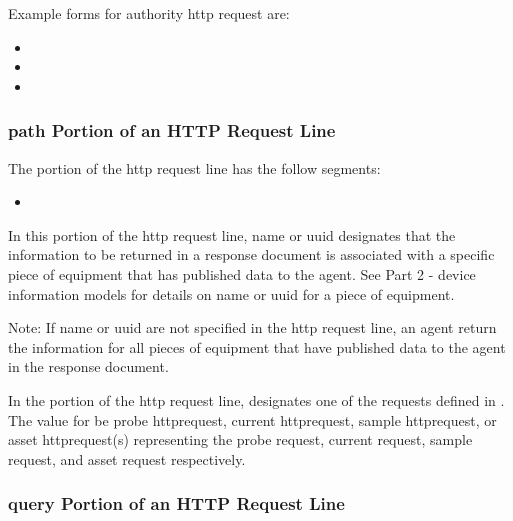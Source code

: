 Example forms for \gls{authority http request} are:

\begin{itemize}
\item {}

\item {}

\item {}
\end{itemize}

\subsubsection{path Portion of an HTTP Request Line}

The  portion of the \gls{http request line} has the follow segments:

\begin{itemize}
\item {}
\end{itemize}

In this portion of the \gls{http request line}, name or uuid designates that the information to be returned in a \gls{response document} is associated with a specific piece of equipment that has published data to the \gls{agent}.  See Part 2 - \glspl{device information model} for details on name or uuid for a piece of equipment.

\begin{note}
Note:  If \gls{name} or \gls{uuid} are not specified in the \gls{http request line}, an \gls{agent} \MUST return the information for all pieces of equipment that have published data to the \gls{agent} in the \gls{response document}.

\end{note}

In the  portion of the \gls{http request line},  designates one of the \glspl{request} defined in .  The value for  \MUST be \gls{probe httprequest}, \gls{current httprequest}, \gls{sample httprequest}, or \gls{asset httprequest}(s) representing the \gls{probe request}, \gls{current request}, \gls{sample request}, and \gls{asset request} respectively.  

\subsubsection{query Portion of an HTTP Request Line}

